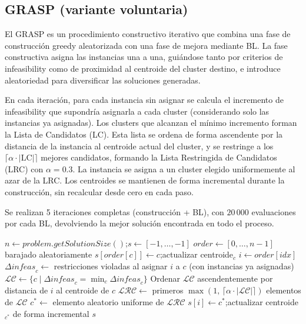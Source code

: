 \documentclass[a4paper,12pt]{article}%
\begin{document}

\subsection{GRASP (variante voluntaria)}

\noindent El GRASP es un procedimiento constructivo iterativo que combina una fase de construcción greedy aleatorizada con una fase de mejora mediante BL. La fase constructiva asigna las instancias una a una, guiándose tanto por criterios de infeasibility como de proximidad al centroide del cluster destino, e introduce aleatoriedad para diversificar las soluciones generadas.

En cada iteración, para cada instancia sin asignar se calcula el incremento de infeasibility que supondría asignarla a cada cluster (considerando solo las instancias ya asignadas). Los clusters que alcanzan el mínimo incremento forman la Lista de Candidatos (LC). Esta lista se ordena de forma ascendente por la distancia de la instancia al centroide actual del cluster, y se restringe a los $\lceil\alpha \cdot |\text{LC}|\rceil$ mejores candidatos, formando la Lista Restringida de Candidatos (LRC) con $\alpha = 0.3$. La instancia se asigna a un cluster elegido uniformemente al azar de la LRC. Los centroides se mantienen de forma incremental durante la construcción, sin recalcular desde cero en cada paso.

Se realizan 5 iteraciones completas (construcción + BL), con $20\,000$ evaluaciones por cada BL, devolviendo la mejor solución encontrada en todo el proceso.

\begin{algorithm}[H]
	\begin{algorithmic}
		\State $n \leftarrow \textit{problem.getSolutionSize}()$;\quad $s \leftarrow [-1,\ldots,-1]$
		\State $\textit{order} \leftarrow [0,\ldots,n-1]$ barajado aleatoriamente
		\State $s[\textit{order}[c]] \leftarrow c$;\quad actualizar centroide$_c$ 
		\EndFor
		\State $i \leftarrow \textit{order}[\textit{idx}]$
		\State $\Delta\textit{infeas}_c \leftarrow$ restricciones violadas al asignar $i$ a $c$ (con instancias ya asignadas)
		\EndFor
		\State $\mathcal{LC} \leftarrow \{c \mid \Delta\textit{infeas}_c = \min_c \Delta\textit{infeas}_c\}$
		\State Ordenar $\mathcal{LC}$ ascendentemente por distancia de $i$ al centroide de $c$
		\State $\mathcal{LRC} \leftarrow$ primeros $\max(1,\,\lceil\alpha \cdot |\mathcal{LC}|\rceil)$ elementos de $\mathcal{LC}$
		\State $c^* \leftarrow$ elemento aleatorio uniforme de $\mathcal{LRC}$
		\State $s[i] \leftarrow c^*$;\quad actualizar centroide$_{c^*}$ de forma incremental
		\EndFor
		\State \Return $s$
		\EndFunction
	\end{algorithmic}
\end{algorithm}
\end{document}
